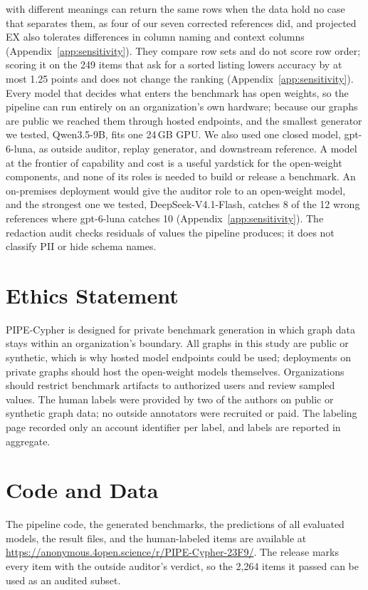 \documentclass[11pt]{article}
\begin{document}
with different meanings can return the same rows when the data hold no case that separates them, as four of our seven corrected references did, and projected EX also tolerates differences in column naming and context columns (Appendix~\ref{app:sensitivity}). They compare row sets and do not score row order; scoring it on the 249 items that ask for a sorted listing lowers accuracy by at most 1.25 points and does not change the ranking (Appendix~\ref{app:sensitivity}). Every model that decides what enters the benchmark has open weights, so the pipeline can run entirely on an organization's own hardware; because our graphs are public we reached them through hosted endpoints, and the smallest generator we tested, Qwen3.5-9B, fits one 24\,GB GPU. We also used one closed model, gpt-6-luna, as outside auditor, replay generator, and downstream reference. A model at the frontier of capability and cost is a useful yardstick for the open-weight components, and none of its roles is needed to build or release a benchmark. An on-premises deployment would give the auditor role to an open-weight model, and the strongest one we tested, DeepSeek-V4.1-Flash, catches 8 of the 12 wrong references where gpt-6-luna catches 10 (Appendix~\ref{app:sensitivity}). The redaction audit checks residuals of values the pipeline produces; it does not classify PII or hide schema names.

\section*{Ethics Statement}
PIPE-Cypher is designed for private benchmark generation in which graph data stays within an organization's boundary. All graphs in this study are public or synthetic, which is why hosted model endpoints could be used; deployments on private graphs should host the open-weight models themselves. Organizations should restrict benchmark artifacts to authorized users and review sampled values. The human labels were provided by two of the authors on public or synthetic graph data; no outside annotators were recruited or paid. The labeling page recorded only an account identifier per label, and labels are reported in aggregate.

\section*{Code and Data}
The pipeline code, the generated benchmarks, the predictions of all evaluated models, the result files, and the human-labeled items are available at \url{https://anonymous.4open.science/r/PIPE-Cypher-23F9/}. The release marks every item with the outside auditor's verdict, so the 2,264 items it passed can be used as an audited subset.
\end{document}
